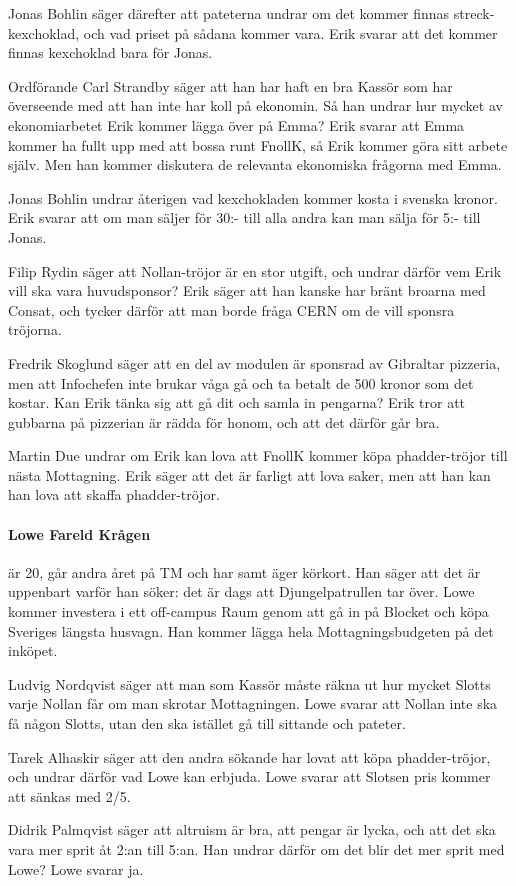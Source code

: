 \documentclass[hidelinks]{sektionsmote} %
\begin{document}
Jonas Bohlin säger därefter att pateterna undrar om det kommer finnas streck-kexchoklad, och vad priset på sådana kommer vara.
Erik svarar att det kommer finnas kexchoklad bara för Jonas.\par
Ordförande Carl Strandby säger att han har haft en bra Kassör som har överseende med att han inte har koll på ekonomin.
Så han undrar hur mycket av ekonomiarbetet Erik kommer lägga över på Emma?
Erik svarar att Emma kommer ha fullt upp med att bossa runt FnollK, så Erik kommer göra sitt arbete själv.
Men han kommer diskutera de relevanta ekonomiska frågorna med Emma.\par
Jonas Bohlin undrar återigen vad kexchokladen kommer kosta i svenska kronor.
Erik svarar att om man säljer för 30:- till alla andra kan man sälja för 5:- till Jonas.\par
Filip Rydin säger att Nollan-tröjor är en stor utgift, och undrar därför vem Erik vill ska vara huvudsponsor?
Erik säger att han kanske har bränt broarna med Consat, och tycker därför att man borde fråga CERN om de vill sponsra tröjorna.\par
Fredrik Skoglund säger att en del av modulen är sponsrad av Gibraltar pizzeria, men att Infochefen inte brukar våga gå och ta betalt de 500 kronor som det kostar.
Kan Erik tänka sig att gå dit och samla in pengarna?
Erik tror att gubbarna på pizzerian är rädda för honom, och att det därför går bra.\par
Martin Due undrar om Erik kan lova att FnollK kommer köpa phadder-tröjor till nästa Mottagning.
Erik säger att det är farligt att lova saker, men att han kan han lova att skaffa phadder-tröjor.

\paragraph{Lowe Fareld Krågen} är 20, går andra året på TM och har samt äger körkort.
Han säger att det är uppenbart varför han söker: det är dags att Djungelpatrullen tar över.
Lowe kommer investera i ett off-campus Raum genom att gå in på Blocket och köpa Sveriges längsta husvagn.
Han kommer lägga hela Mottagningsbudgeten på det inköpet.\par
Ludvig Nordqvist säger att man som Kassör måste räkna ut hur mycket Slotts varje Nollan får om man skrotar Mottagningen.
Lowe svarar att Nollan inte ska få någon Slotts, utan den ska istället gå till sittande och pateter.\par
Tarek Alhaskir säger att den andra sökande har lovat att köpa phadder-tröjor, och undrar därför vad Lowe kan erbjuda.
Lowe svarar att Slotsen pris kommer att sänkas med 2/5.\par
Didrik Palmqvist säger att altruism är bra, att pengar är lycka, och att det ska vara mer sprit åt 2:an till 5:an.
Han undrar därför om det blir det mer sprit med Lowe?
Lowe svarar ja.
\end{document}
